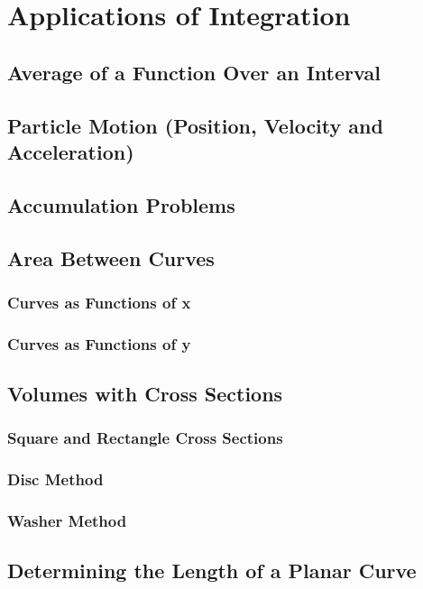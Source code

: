\section{Applications of Integration}

\subsection{Average of a Function Over an Interval}

\subsection{Particle Motion (Position, Velocity and Acceleration)}

\subsection{Accumulation Problems}

\subsection{Area Between Curves}

\subsubsection{Curves as Functions of x}

\subsubsection{Curves as Functions of y}

\subsection{Volumes with Cross Sections}

\subsubsection{Square and Rectangle Cross Sections}

\subsubsection{Disc Method}

\subsubsection{Washer Method}

\subsection{Determining the Length of a Planar Curve}
